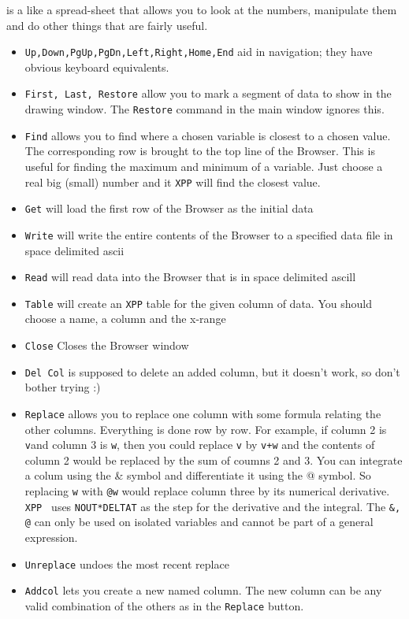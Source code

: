 \documentclass{article}
\begin{document}
\bigskip
{} is a like a spread-sheet that allows you to look at the numbers, manipulate them and do other things that are fairly useful.
\begin{itemize}
\item {\tt Up,Down,PgUp,PgDn,Left,Right,Home,End} aid in navigation; they have obvious keyboard equivalents. 

\item {\tt First, Last, Restore} allow you to mark a segment of data to show in the drawing window. The {\tt Restore} command in the main window ignores this. 
\item {\tt Find} allows you to find where a chosen variable is closest to a chosen value. The corresponding row is brought to the top line of the Browser. This is useful for finding the maximum and minimum of a variable. Just choose a real big (small) number and it {\tt XPP} will find the closest value. 
\item{\tt Get} will load the first row of the Browser as the initial data
\item{\tt Write} will write the entire contents of the Browser to a specified data file in space delimited ascii
\item{\tt Read} will read data into the Browser that is in space delimited ascill
\item{\tt Table} will create an {\tt XPP} table for the given column of data. You should choose a name, a column and the x-range
\item{\tt Close} Closes the Browser window
\item{\tt Del Col} is supposed to delete an added column, but it doesn't work, so don't bother trying :)
\item{\tt Replace} allows you to replace one column with some formula relating the other columns. Everything is done row by row. For example, if column 2 is {\tt v}and column 3 is {\tt w}, then you could replace {\tt v} by {\tt v+w} and the contents of column 2 would be replaced by the sum of coumns 2 and 3.  You can integrate a colum using the \& symbol and differentiate it using the @ symbol. So replacing {\tt w} with {\tt @w} would replace column three by its numerical derivative. {\tt XPP } uses {\tt NOUT*DELTAT} as the step for the derivative and the integral. The {\tt \&, @} can only be used on isolated variables and cannot be part of a general expression.  
\item{\tt Unreplace} undoes the most recent replace
\item{\tt Addcol} lets you create a new named column. The new column can be any valid combination of the others as in the {\tt Replace} button.
\end{itemize}
\end{document}
